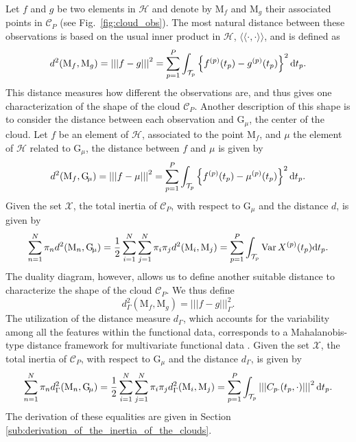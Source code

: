 \documentclass[times,sort&compress,3p]{elsarticle}
\theoremstyle{plain}%
\theoremstyle{definition}
\newcommand{\XX}{\mathcal{X}} %
\newcommand{\dd}{{\rm d}}
\newcommand{\TT}[1]{\mathcal{T}_{#1}} %
\newcommand{\HH}{\mathcal{H}} %
\newcommand{\inH}[2]{\langle\!\langle#1, #2\rangle\!\rangle}
\newcommand{\normH}[1]{\left|\left|\left|#1\right|\right|\right|}
\newcommand{\normHG}[1]{\left|\left|\left|#1\right|\right|\right|_\Gamma}
\newcommand{\Xp}[1]{X^{(#1)}} %
\newcommand{\mup}[1]{\mu^{(#1)}} %
\newcommand{\fp}{f^{(p)}}
\newcommand{\gp}{g^{(p)}}
\newcommand{\pobs}[1]{\mathrm{#1}} %
\newcommand{\Gmu}{\pobs{G}_{\!\mu}} %
\newcommand{\CP}{\mathcal{C}_{\!P}} %
\DeclareMathOperator{\Var}{Var}
\begin{document}
Let $f$ and $g$ be two elements in $\HH$ and denote by $\pobs{M}_f$ and $\pobs{M}_g$ their associated points in $\CP$ (see Fig.~\ref{fig:cloud_obs}). The most natural distance between these observations is based on the usual inner product in $\HH$, $\inH{\cdot}{\cdot}$, and is defined as
\begin{equation}\label{eq:distance_obs}
    d^2(\pobs{M}_f, \pobs{M}_g) = \normH{f - g}^2 = \sum_{p = 1}^P \int_{\TT{p}}\left\{\fp(t_p) - \gp(t_p)\right\}^2 \dd t_p.
\end{equation}
This distance measures how different the observations are, and thus gives one characterization of the shape of the cloud $\CP$. Another description of this shape is to consider the distance between each observation and $\Gmu$, the center of the cloud. Let $f$ be an element of $\HH$, associated to the point $\pobs{M}_f$, and $\mu$ the element of $\HH$ related to $\Gmu$, the distance between $f$ and $\mu$ is given by
\begin{equation}\label{eq:distance_center}
    d^2(\pobs{M}_f, \Gmu) = \normH{f - \mu}^2 = \sum_{p = 1}^P \int_{\TT{p}}\left\{\fp(t_p) - \mup{p}(t_p)\right\}^2 \dd t_p.
\end{equation}
Given the set $\XX$, the total inertia of $\CP$, with respect to $\Gmu$ and the distance $d$, is given by
\begin{equation}\label{eq:inertia}
    \sum_{n = 1}^N \pi_n d^2(\pobs{M}_n, \Gmu) = \frac{1}{2}\sum_{i = 1}^N \sum_{j = 1}^N \pi_i \pi_j d^2(\pobs{M}_i, \pobs{M}_j) = \sum_{p = 1}^P \int_{\TT{p}}\Var{\Xp{p}(t_p)} \dd t_p.
\end{equation}
The duality diagram, however, allows us to define another suitable distance to characterize the shape of the cloud $\CP$. We thus define
\begin{equation}
    d^2_\Gamma(\pobs{M}_f, \pobs{M}_g) = \normHG{f - g}^2.
\end{equation}
The utilization of the distance measure $d_\Gamma$, which accounts for the variability among all the features within the functional data, corresponds to a Mahalanobis-type distance framework for multivariate functional data \cite{berrenderoMahalanobisDistanceFunctional2020,martinoKmeansProcedureBased2019}.
Given the set $\XX$, the total inertia of $\CP$, with respect to $\Gmu$ and the distance $d_\Gamma$, is given by
\begin{equation}\label{eq:inertia_CP}
    \sum_{n = 1}^N \pi_n d_\Gamma^2(\pobs{M}_n, \Gmu) = \frac{1}{2}\sum_{i = 1}^N \sum_{j = 1}^N \pi_i \pi_j d_\Gamma^2(\pobs{M}_i, \pobs{M}_j) = \sum_{p = 1}^P \int_{\TT{p}} \normH{C_{p \cdot}(t_p, \cdot)}^2 \dd t_p.
\end{equation}
The derivation of these equalities are given in Section \ref{sub:derivation_of_the_inertia_of_the_clouds}.
\end{document}

